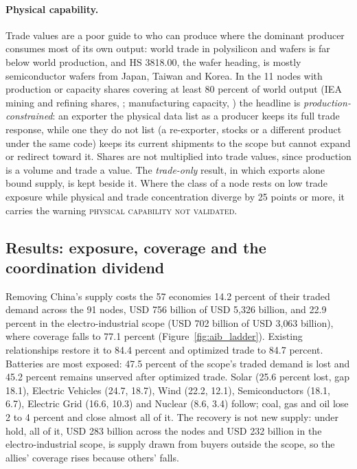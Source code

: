 \paragraph{Physical capability.} Trade values are a poor guide to who can produce where the dominant
producer consumes most of its own output: world trade in polysilicon and wafers is far below world
production, and HS 3818.00, the wafer heading, is mostly semiconductor wafers from Japan, Taiwan and
Korea. In the 11 nodes with production or capacity shares covering at least 80 percent of world
output (IEA mining and refining shares, \citealp{iea2026cmdata}; manufacturing capacity,
\citealp{cim2026}) the headline is \emph{production-constrained}: an exporter the physical data list
as a producer keeps its full trade response, while one they do not list (a re-exporter, stocks or a
different product under the same code) keeps its current shipments to the scope but cannot expand or
redirect toward it. Shares are not multiplied into trade values, since production is a volume and
trade a value. The \emph{trade-only} result, in which exports alone bound supply, is kept beside it.
Where the class of a node rests on low trade exposure while physical and trade concentration diverge
by 25 points or more, it carries the warning \textsc{physical capability not validated}.

\subsection{Results: exposure, coverage and the coordination dividend}
\label{subsec:aib_results}

Removing China's supply costs the 57 economies 14.2 percent of their traded demand across the 91
nodes, USD 756 billion of USD 5{,}326 billion, and 22.9 percent in the electro-industrial scope (USD
702 billion of USD 3{,}063 billion), where coverage falls to 77.1 percent (Figure~\ref{fig:aib_ladder}).
Existing relationships restore it to 84.4 percent and optimized trade to 84.7 percent. Batteries are
most exposed: 47.5 percent of the scope's traded demand is lost and 45.2 percent remains unserved
after optimized trade. Solar (25.6 percent lost, gap 18.1), Electric Vehicles (24.7, 18.7), Wind (22.2,
12.1), Semiconductors (18.1, 6.7), Electric Grid (16.6, 10.3) and Nuclear (8.6, 3.4) follow; coal, gas
and oil lose 2 to 4 percent and close almost all of it. The recovery is not new supply: under hold,
all of it, USD 283 billion across the nodes and USD 232 billion in the electro-industrial scope, is
supply drawn from buyers outside the scope, so the allies' coverage rises because others' falls.

